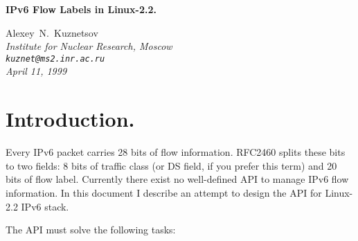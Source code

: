 \def\TITLE{IPv6 Flow Labels}

\begin{center}
\Large\bf IPv6 Flow Labels in Linux-2.2.
\end{center}


\begin{center}
{ \large Alexey~N.~Kuznetsov } \\
\em Institute for Nuclear Research, Moscow \\
\verb|kuznet@ms2.inr.ac.ru| \\
\rm April 11, 1999
\end{center}

\vspace{5mm}

\tableofcontents

\section{Introduction.}

Every IPv6 packet carries 28 bits of flow information. RFC2460 splits
these bits to two fields: 8 bits of traffic class (or DS field, if you
prefer this term) and 20 bits of flow label. Currently there exist
no well-defined API to manage IPv6 flow information. In this document
I describe an attempt to design the API for Linux-2.2 IPv6 stack.

\vskip 1mm

The API must solve the following tasks:

